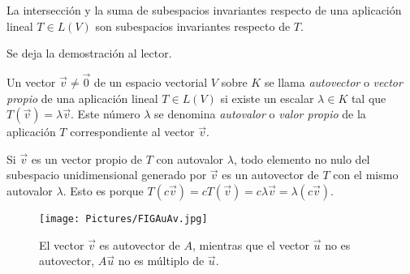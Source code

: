 \bigskip

\begin{theorem}
\label{intysumainv}
\noindent
La intersección y la suma de subespacios invariantes respecto de una aplicación lineal $T\in L(V)$ son subespacios invariantes respecto de $T$.

Se deja la demostración al lector.

\end{theorem} 

\bigskip

\bigskip

\bigskip


\begin{definition}

\bigskip

Un vector $\vec{v}\neq \vec{0}$ de un espacio vectorial $V$ sobre $K$ se llama \textit{autovector} o \textit{vector propio}  de una aplicación lineal $T\in L(V)$ si existe un escalar $\lambda \in K$ tal que $T(\vec{v})=\lambda \vec{v}$. Este número $\lambda $ se denomina \textit{autovalor }o \textit{valor propio} de la aplicación $T$ correspondiente al vector $\vec{v}$.

\end{definition}

\bigskip

\begin{remark}
Si $\vec{v}$  es un vector propio de $T$ con autovalor  $\lambda$, todo elemento no nulo del subespacio unidimensional generado por $\vec{v}$ es un autovector de $T$ con el mismo autovalor $\lambda $. Esto es porque $T(c \vec{v})=c T(\vec{v})= c \lambda \vec{v}=\lambda (c\vec{v}) $.
\end{remark}
\bigskip



\begin{figure}
    \centering
    \texttt{[image: Pictures/FIGAuAv.jpg]}
    \caption{El vector $\vec{v}$ es autovector de $A$, mientras que el vector $\vec{u}$ no es autovector,   $A\vec{u}$  no es múltiplo de $\vec{u}$.}
    \label{FIGAuAv}
\end{figure}

\bigskip

